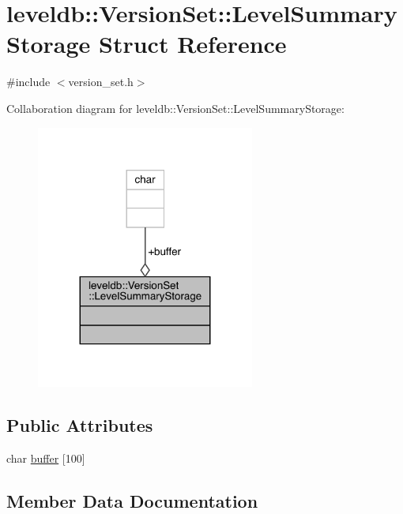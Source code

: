 \hypertarget{structleveldb_1_1_version_set_1_1_level_summary_storage}{}\section{leveldb\+::Version\+Set\+::Level\+Summary\+Storage Struct Reference}
\label{structleveldb_1_1_version_set_1_1_level_summary_storage}


{\ttfamily \#include $<$version\+\_\+set.\+h$>$}



Collaboration diagram for leveldb\+::Version\+Set\+::Level\+Summary\+Storage\+:
\nopagebreak
\begin{figure}[H]
\begin{center}
\leavevmode
\includegraphics[width=203pt]{structleveldb_1_1_version_set_1_1_level_summary_storage__coll__graph}
\end{center}
\end{figure}
\subsection*{Public Attributes}
\begin{DoxyCompactItemize}
\item 
char \mbox{\hyperlink{structleveldb_1_1_version_set_1_1_level_summary_storage_a90b283461affa0f25f41bc21a9c81bbc}{buffer}} \mbox{[}100\mbox{]}
\end{DoxyCompactItemize}


\subsection{Member Data Documentation}
\mbox{\label{structleveldb_1_1_version_set_1_1_level_summary_storage_a90b283461affa0f25f41bc21a9c81bbc}} 

